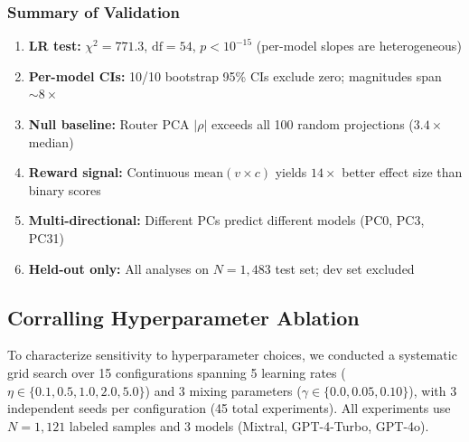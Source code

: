 \subsubsection{Summary of Validation}

\begin{enumerate}[leftmargin=*,noitemsep,topsep=0pt]
    \item \textbf{LR test:} $\chi^2 = 771.3$, $\text{df}{=}54$, $p < 10^{-15}$ (per-model slopes are heterogeneous)
    \item \textbf{Per-model CIs:} 10/10 bootstrap 95\% CIs exclude zero; magnitudes span ${\sim}8\times$
    \item \textbf{Null baseline:} Router PCA $|\rho|$ exceeds all 100 random projections ($3.4\times$ median)
    \item \textbf{Reward signal:} Continuous $\text{mean}(v \times c)$ yields $14\times$ better effect size than binary scores
    \item \textbf{Multi-directional:} Different PCs predict different models (PC0, PC3, PC31)
    \item \textbf{Held-out only:} All analyses on $N{=}1{,}483$ test set; dev set excluded
\end{enumerate}


\subsection{Corralling Hyperparameter Ablation}
\label{app:corralling_ablation}

To characterize sensitivity to hyperparameter choices, we conducted a systematic grid search over 15 configurations spanning 5 learning rates ($\eta \in \{0.1, 0.5, 1.0, 2.0, 5.0\}$) and 3 mixing parameters ($\gamma \in \{0.0, 0.05, 0.10\}$), with 3 independent seeds per configuration (45 total experiments). All experiments use $N=1{,}121$ labeled samples and 3 models (Mixtral, GPT-4-Turbo, GPT-4o).

